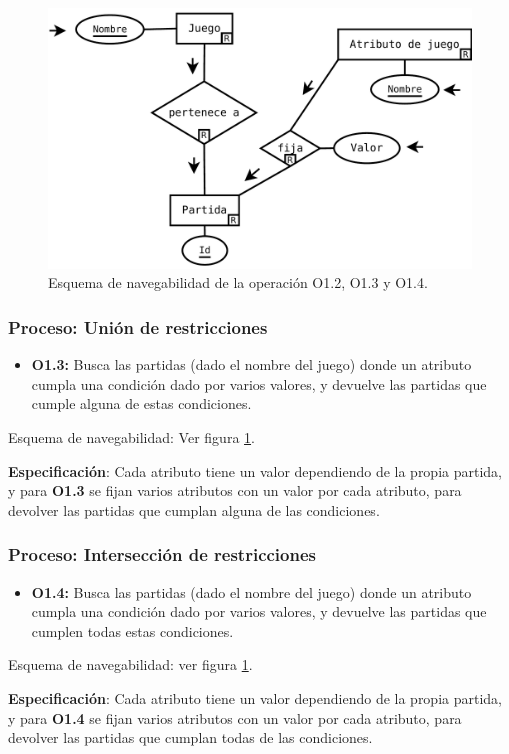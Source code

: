 \begin{figure}[h!]
	\centering
	\includegraphics[width=0.7\linewidth]{../Diagramas/pdf/Op2-Consulta.pdf}
	\caption{Esquema de navegabilidad de la operación O1.2, O1.3 y O1.4.}
	
	\label{fig:O1.2}
\end{figure}


\subsubsection{Proceso: Unión de restricciones}

\begin{itemize}
	\item \textbf{O1.3:} Busca las partidas (dado el nombre del juego) donde un atributo cumpla una condición dado por varios valores, y devuelve las partidas que cumple alguna de estas condiciones.
\end{itemize}

Esquema de navegabilidad: Ver figura \ref{fig:O1.2}.

\textbf{Especificación}: Cada atributo tiene un valor dependiendo de la propia partida, y para \textbf{O1.3} se fijan varios atributos con un valor por cada atributo, para devolver las partidas que cumplan alguna de las condiciones.


\subsubsection{Proceso: Intersección de restricciones}

\begin{itemize}
	\item \textbf{O1.4:} Busca las partidas (dado el nombre del juego) donde un atributo cumpla una condición dado por varios valores, y devuelve las partidas que cumplen todas estas condiciones.
\end{itemize}

Esquema de navegabilidad: ver figura \ref{fig:O1.2}.

\textbf{Especificación}: Cada atributo tiene un valor dependiendo de la propia partida, y para \textbf{O1.4} se fijan varios atributos con un valor por cada atributo, para devolver las partidas que cumplan todas de las condiciones.
